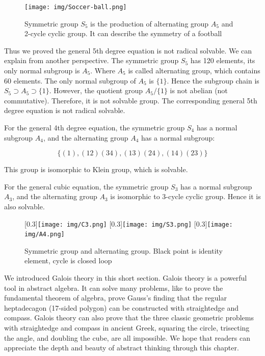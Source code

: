 \documentclass[b5paper]{article}
\begin{document}
\begin{figure}[htbp]
 \centering
 \texttt{[image: img/Soccer-ball.png]}
 \captionsetup{labelformat=empty}
 \caption{Symmetric group $S_5$ is the production of alternating group $A_5$ and 2-cycle cyclic group. It can describe the symmetry of a football}
 \label{fig:S5}
\end{figure}

Thus we proved the general 5th degree equation is not radical solvable. We can explain from another perspective. The symmetric group $S_5$ has 120 elements, its only normal subgroup is $A_5$. Where $A_5$ is called alternating group, which contains 60 elements. The only normal subgroup of $A_5$ is $\{1\}$. Hence the subgroup chain is $S_5 \supset A_5 \supset \{1\}$. However, the quotient group $A_5/\{1\}$ is not abelian (not commutative). Therefore, it is not solvable group. The corresponding general 5th degree equation is not radical solvable.

For the general 4th degree equation, the symmetric group $S_4$ has a normal subgroup $A_4$, and the alternating group $A_4$ has a normal subgroup:

\[
\{(1), (1 2)(3 4), (1 3)(2 4), (1 4)(2 3)\}
\]

This group is isomorphic to Klein group, which is solvable.

For the general cubic equation, the symmetric group $S_3$ has a normal subgroup $A_3$, and the alternating group $A_3$ is isomorphic to 3-cycle cyclic group. Hence it is also solvable.

\begin{figure}[htbp]
  \centering
  [0.3\linewidth]{\texttt{[image: img/C3.png]}} \quad
  [0.3\linewidth]{\texttt{[image: img/S3.png]}}
  [0.3\linewidth]{\texttt{[image: img/A4.png]}}
  \caption{Symmetric group and alternating group. Black point is identity element, cycle is closed loop}
  \label{fig:group-graph}
\end{figure}

We introduced Galois theory in this short section. Galois theory is a powerful tool in abstract algebra. It can solve many problems, like to prove the fundamental theorem of algebra, prove Gauss's finding that the regular heptadecagon (17-sided polygon) can be constructed with straightedge and compass. Galois theory can also prove that the three classic geometric problems with straightedge and compass in ancient Greek, squaring the circle, trisecting the angle, and doubling the cube, are all impossible. We hope that readers can appreciate the depth and beauty of abstract thinking through this chapter.
\end{document}
